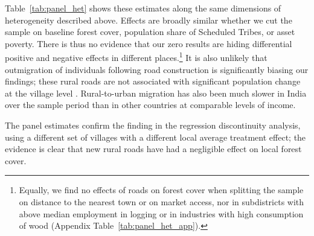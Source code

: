 Table~\ref{tab:panel_het} shows these estimates along the same
dimensions of heterogeneity described above. Effects are broadly
similar whether we cut the sample on baseline forest cover, population
share of Scheduled Tribes, or asset poverty. There is thus no evidence
that our zero results are hiding differential positive and negative
effects in different places.\footnote{Equally, we find no effects of
  roads on forest cover when splitting the sample on distance to the
  nearest town or on market access, nor in subdistricts with above
  median employment in logging or in industries with high consumption
  of wood (Appendix Table~\ref{tab:panel_het_app}).} It is also
unlikely that outmigration of individuals following road construction
is significantly biasing our findings; these rural roads are not
associated with significant population change at the village level
\cite{AN17}. Rural-to-urban migration has also been much slower in
India over the sample period than in other countries at comparable
levels of income.

The panel estimates confirm the finding in the regression
discontinuity analysis, using a different set of villages with a
different local average treatment effect; the evidence is clear that
new rural roads have had a negligible effect on local forest cover.

